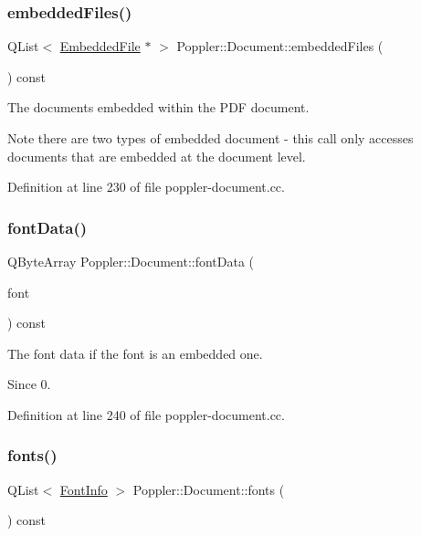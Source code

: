 \subsubsection{\texorpdfstring{embedded\+Files()}{embeddedFiles()}}
{\footnotesize\ttfamily Q\+List$<$ \hyperlink{class_poppler_1_1_embedded_file}{Embedded\+File} $\ast$ $>$ Poppler\+::\+Document\+::embedded\+Files (\begin{DoxyParamCaption}{ }\end{DoxyParamCaption}) const}

The documents embedded within the P\+DF document.

\begin{DoxyNote}{Note}
there are two types of embedded document -\/ this call only accesses documents that are embedded at the document level. 
\end{DoxyNote}


Definition at line 230 of file poppler-\/document.\+cc.

\mbox{\label{class_poppler_1_1_document_a5b4ce85bc240c703e45dfa94d6838ce5}} 
\subsubsection{\texorpdfstring{font\+Data()}{fontData()}}
{\footnotesize\ttfamily Q\+Byte\+Array Poppler\+::\+Document\+::font\+Data (\begin{DoxyParamCaption}\item[{const \hyperlink{class_poppler_1_1_font_info}{Font\+Info} \&}]{font }\end{DoxyParamCaption}) const}

The font data if the font is an embedded one.

\begin{DoxySince}{Since}
0. 
\end{DoxySince}


Definition at line 240 of file poppler-\/document.\+cc.

\mbox{\label{class_poppler_1_1_document_ad08deee0fbcf175c979c6057f78bded6}} 
\subsubsection{\texorpdfstring{fonts()}{fonts()}}
{\footnotesize\ttfamily Q\+List$<$ \hyperlink{class_poppler_1_1_font_info}{Font\+Info} $>$ Poppler\+::\+Document\+::fonts (\begin{DoxyParamCaption}{ }\end{DoxyParamCaption}) const}

